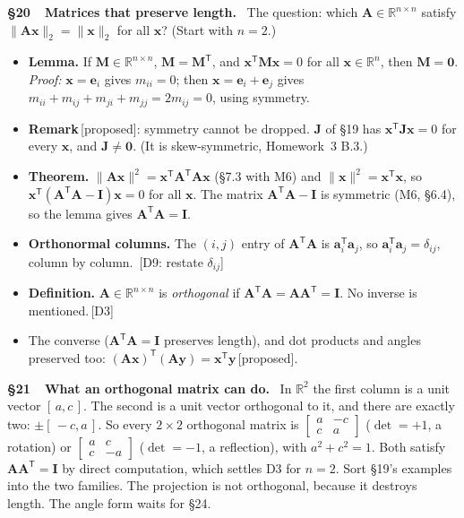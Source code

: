 \documentclass[11pt]{article}
\newcommand{\R}{\mathbb{R}}
\newcommand{\vc}[1]{\mathbf{#1}}
\newcommand{\mt}[1]{\mathbf{#1}}
\newcommand{\T}{^{\mathsf{T}}}
\newcommand{\norm}[1]{\lVert #1\rVert}
\newcommand{\prop}{\,{\color{ForestGreen}\sffamily\scriptsize[proposed]}}
\newcommand{\see}[1]{\,{\color{BrickRed}\sffamily\scriptsize[#1]}}
\newcommand{\sect}[2]{\par\smallskip\noindent\textbf{\S#1\ \ #2.}\ \ignorespaces}
\begin{document}
\sect{20}{Matrices that preserve length} The question: which
$\mt{A}\in\R^{n\times n}$ satisfy $\norm{\mt{A}\vc{x}}_2=\norm{\vc{x}}_2$ for all
$\vc{x}$? (Start with $n=2$.)
\begin{itemize}[leftmargin=1.4em]
  \item \textbf{Lemma.} If $\mt{M}\in\R^{n\times n}$, $\mt{M}=\mt{M}\T$, and
        $\vc{x}\T\mt{M}\vc{x}=0$ for all $\vc{x}\in\R^{n}$, then $\mt{M}=\mt{0}$.
        \emph{Proof:} $\vc{x}=\vc{e}_i$ gives $m_{ii}=0$; then
        $\vc{x}=\vc{e}_i+\vc{e}_j$ gives
        $m_{ii}+m_{ij}+m_{ji}+m_{jj}=2m_{ij}=0$, using symmetry.
  \item \textbf{Remark}\prop: symmetry cannot be dropped. $\mt{J}$ of \S19 has
        $\vc{x}\T\mt{J}\vc{x}=0$ for every $\vc{x}$, and $\mt{J}\neq\mt{0}$.
        (It is skew-symmetric, Homework~3 B.3.)
  \item \textbf{Theorem.} $\norm{\mt{A}\vc{x}}^{2}=\vc{x}\T\mt{A}\T\mt{A}\vc{x}$
        (\S7.3 with M6) and $\norm{\vc{x}}^{2}=\vc{x}\T\vc{x}$, so
        $\vc{x}\T(\mt{A}\T\mt{A}-\mt{I})\vc{x}=0$ for all $\vc{x}$. The matrix
        $\mt{A}\T\mt{A}-\mt{I}$ is symmetric (M6, \S6.4), so the lemma gives
        $\mt{A}\T\mt{A}=\mt{I}$.
  \item \textbf{Orthonormal columns.} The $(i,j)$ entry of $\mt{A}\T\mt{A}$ is
        $\vc{a}_i\T\vc{a}_j$, so $\vc{a}_i\T\vc{a}_j=\delta_{ij}$, column by column.
        \see{D9: restate $\delta_{ij}$}
  \item \textbf{Definition.} $\mt{A}\in\R^{n\times n}$ is \emph{orthogonal} if
        $\mt{A}\T\mt{A}=\mt{A}\mt{A}\T=\mt{I}$. No inverse is mentioned.\see{D3}
  \item The converse ($\mt{A}\T\mt{A}=\mt{I}$ preserves length), and dot
        products and angles preserved too:
        $(\mt{A}\vc{x})\T(\mt{A}\vc{y})=\vc{x}\T\vc{y}$\prop.
\end{itemize}

\sect{21}{What an orthogonal matrix can do} In $\R^{2}$ the first column is a
unit vector $[\,a,c\,]$. The second is a unit vector orthogonal to it, and there
are exactly two: $\pm[\,-c,a\,]$. So every $2\times2$ orthogonal matrix is
$\begin{bmatrix}a&-c\\c&a\end{bmatrix}$ ($\det=+1$, a rotation) or
$\begin{bmatrix}a&c\\c&-a\end{bmatrix}$ ($\det=-1$, a reflection), with
$a^{2}+c^{2}=1$. Both satisfy $\mt{A}\mt{A}\T=\mt{I}$ by direct computation,
which settles D3 for $n=2$. Sort \S19's examples into the two families. The
projection is not orthogonal, because it destroys length. The angle form waits
for \S24.
\end{document}
